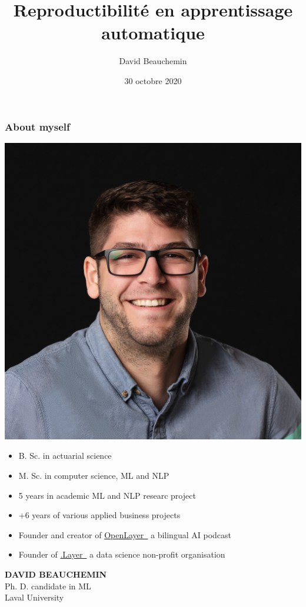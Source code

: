 \documentclass[aspectratio=169,10pt,xcolor=x11names,english,french]{beamer}
\title{Reproductibilité en apprentissage automatique}
\author{David Beauchemin}
\date{30 octobre 2020}
\newcommand{\link}[2]{\href{#1}{#2~{\smaller\faExternalLink*}}}
\newcounter{frame}[frame]
\begin{document}
	
	
	
	
	\begin{frame}
		\frametitle{About myself}
		
		\begin{minipage}{0.25\linewidth}
			\includegraphics[width=\linewidth,keepaspectratio]{img/david}
		\end{minipage}
		\hfill
		\begin{minipage}{0.70\linewidth}
			\begin{itemize}
				\item B. Sc. in actuarial science
				\item M. Sc. in computer science, ML and NLP
				\item 5 years in academic ML and NLP researc project
				\item +6 years of various applied business projects
				\item Founder and creator of \link{https://anchor.fm/open-layer}{OpenLayer} a bilingual AI podcast
				\item Founder of \link{https://www.dotlayer.org/}{.Layer} a data science non-profit organisation
			\end{itemize}
		\end{minipage}
		
		\begin{minipage}{0.25\linewidth}
			\small
			\textbf{DAVID BEAUCHEMIN} \\
			Ph. D. candidate in ML\\
			\footnotesize Laval University
		\end{minipage}
	\end{frame}
	
\end{document}
